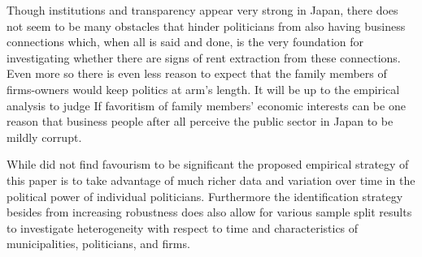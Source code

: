 \label{sec:results}
Though institutions and transparency appear very strong in Japan, there does not seem to be many obstacles that hinder politicians from also having business connections which, when all is said and done, is the very foundation for investigating whether there are signs of rent extraction from these connections. Even more so there is even less reason to expect that the family members of firms-owners would keep politics at arm's length. It will be up to the empirical analysis to judge If favoritism of family members' economic interests can be one reason that business people after all perceive the public sector in Japan to be mildly corrupt.

While \citet{faccio2006politically} did not find favourism to be significant the proposed empirical strategy of this paper is to take advantage of much richer data and variation over time in the political power of individual politicians. Furthermore the identification strategy besides from increasing robustness does also allow for various sample split results to investigate heterogeneity with respect to time and characteristics of municipalities, politicians, and firms.
